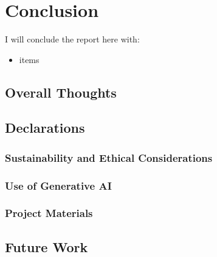 \chapter{Conclusion}
I will conclude the report here with:
\begin{itemize}
  \item items
\end{itemize}

\section{Overall Thoughts}

\section{Declarations}
  \subsection{Sustainability and Ethical Considerations}

  \subsection{Use of Generative AI}

  \subsection{Project Materials}

\section{Future Work}

